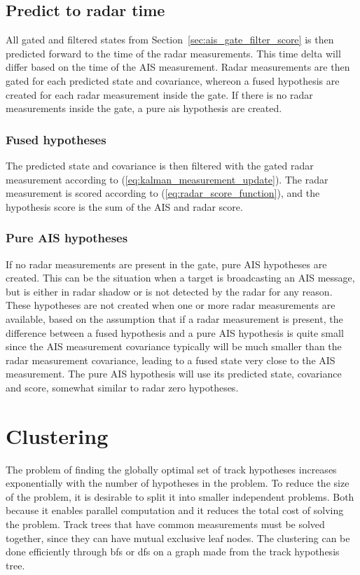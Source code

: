 \subsection{Predict to radar time}
All gated and filtered states from Section~\ref{sec:ais_gate_filter_score} is then predicted forward to  the time of the radar measurements. This time delta will differ based on the time of the AIS measurement. Radar measurements are then gated for each predicted state and covariance, whereon a fused hypothesis are created for each radar measurement inside the gate. If there is no radar measurements inside the \gls{gate}, a pure \gls{ais} hypothesis are created. 

\subsubsection{Fused hypotheses}
The predicted state and covariance is then filtered with the gated radar measurement according to (\ref{eq:kalman_measurement_update}). The radar measurement is scored according to (\ref{eq:radar_score_function}), and the hypothesis score is the sum of the AIS and radar score.

\subsubsection{Pure AIS hypotheses}\label{subsec:pure_ais_hypotheses}
If no radar measurements are present in the gate, pure AIS hypotheses are created. This can be the situation when a target is broadcasting an AIS message, but is either in radar shadow or is not detected by the radar for any reason. These hypotheses are not created when one or more radar measurements are available, based on the assumption that if a radar measurement is present, the difference between a fused hypothesis and a pure AIS hypothesis is quite small since the AIS measurement covariance typically will be much smaller than the radar measurement covariance, leading to a fused state very close to the AIS measurement. The pure AIS hypothesis will use its predicted state, covariance and score, somewhat similar to radar zero hypotheses.

\section{Clustering}
The problem of finding the globally optimal set of track hypotheses increases exponentially with the number of hypotheses in the problem. To reduce the size of the problem, it is desirable to split it into smaller independent problems. Both because it enables parallel computation and it reduces the total cost of solving the problem. Track trees that have common measurements must be solved together, since they can have mutual exclusive leaf nodes. The clustering can be done efficiently through \gls{bfs} or \gls{dfs} on a graph made from the \gls{track hypothesis tree}.

